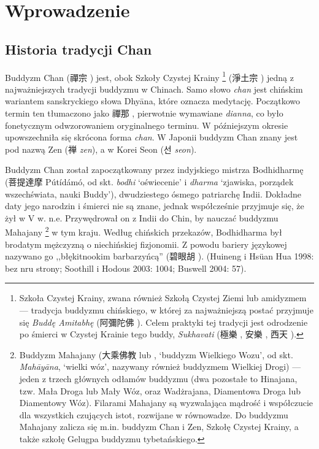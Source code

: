 \maketitle
\vspace*{-45pt}
\section{Wprowadzenie}
\vspace*{-20pt}
\subsection{Historia tradycji Chan}
Buddyzm Chan (禪宗 ) jest, obok Szkoły Czystej Krainy%
\footnote{Szkoła Czystej Krainy, zwana również Szkołą Czystej Ziemi lub amidyzmem --- tradycja buddyzmu chińskiego, w której za najważniejszą postać przyjmuje się \textit{Buddę Amitabhę} (阿彌陀佛 ). Celem praktyki tej tradycji jest odrodzenie po śmierci w Czystej Krainie tego buddy, \textit{Sukhavati} (極樂 , 安樂 , 西天 ).} %
(淨土宗 ) jedną z najważniejszych tradycji buddyzmu w Chinach. Samo słowo \textit{chan} jest chińskim wariantem %
sanskryckiego słowa Dhyāna, które oznacza medytację. %
Początkowo termin ten tłumaczono jako 禪那 , pierwotnie wymawiane \textit{dianna}, co było fonetycznym odwzorowaniem oryginalnego terminu. W późniejszym okresie upowszechniła się skrócona forma \textit{chan}. W Japonii buddyzm Chan znany jest pod nazwą Zen (禅 \textit{zen}), a w Korei Seon ({\Korean 선} \textit{seon}).

Buddyzm Chan został zapoczątkowany przez indyjskiego mistrza Bodhidharmę (菩提達摩 Pútídámó, od skt. \textit{bodhi} `oświecenie' i \textit{dharma} `zjawiska, porządek wszechświata, nauki Buddy'), dwudziestego ósmego patriarchę Indii. Dokładne daty jego narodzin i śmierci nie są znane, jednak współcześnie przyjmuje się, że żył w V w. n.e. Przywędrował on z Indii do Chin, by nauczać buddyzmu Mahajany
\footnote{Buddyzm Mahajany (大乘佛教  lub , `buddyzm Wielkiego Wozu', od skt. \textit{Mahāyāna}, `wielki wóz', nazywany również buddyzmem Wielkiej Drogi) --- jeden z trzech głównych odłamów buddyzmu (dwa pozostałe to Hinajana, tzw. Mała Droga lub Mały Wóz, oraz Wadżrajana, Diamentowa Droga lub Diamentowy Wóz). Filarami Mahajany są wyzwalająca mądrość i współczucie dla wszystkich czujących istot, rozwijane w równowadze. Do buddyzmu Mahajany zalicza się m.in. buddyzm Chan i Zen, Szkołę Czystej Krainy, a także szkołę Gelugpa buddyzmu tybetańskiego.}
w tym kraju. Według chińskich przekazów, Bodhidharma był brodatym mężczyzną o niechińskiej fizjonomii. Z powodu bariery językowej nazywano go ,,błękitnookim barbarzyńcą'' (碧眼胡 ). (Huineng i Hsüan Hua 1998: bez nru strony; Soothill i Hodous 2003: 1004; Buswell 2004: 57).

